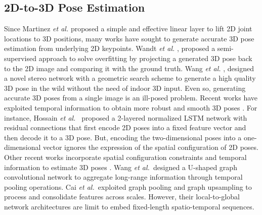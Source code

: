 \documentclass[letterpaper, 10 pt, conference, twoside]{ieeeconf}
\newcommand{\et}{{\em et al.\ }}
\begin{document}
\subsection{2D-to-3D Pose Estimation}
Since Martinez \emph{et al.} \cite{martinez2017simple} proposed a simple and effective linear layer to lift 2D joint locations to 3D positions, many works \cite{dabral2018learning,wandt2019repnet,wang2019generalizing} have sought to generate accurate 3D pose estimation from underlying 2D keypoints. Wandt \emph{et al.} \cite{wandt2019repnet}, proposed a semi-supervised approach to solve overfitting by projecting a generated 3D pose back to the 2D image and comparing it with the ground truth. Wang \emph{et al.} \cite{wang2019generalizing}, designed a novel stereo network with a geometric search scheme to generate a high quality 3D pose in the wild without the need of indoor 3D input. Even so, generating accurate 3D poses from a single image is an ill-posed problem. Recent works have exploited  temporal information to obtain more robust and smooth 3D poses \cite{dabral2018learning,rayat2018exploiting,pavllo20193d,cai2019exploiting,lee2018propagating}. For instance, Hossain \et \cite{rayat2018exploiting} proposed a 2-layered normalized LSTM network with residual connections that first encode 2D poses into a fixed feature vector and then decode it to a 3D pose. But, encoding the two-dimensional poses into a one-dimensional vector ignores the expression of the spatial configuration of 2D poses. Other recent works incorporate spatial configuration constraints and temporal information to estimate 3D poses \cite{cai2019exploiting, wang2020motion}. Wang \cite{wang2020motion} \et designed a U-shaped graph convolutional network to aggregate long-range information through temporal pooling operations. Cai \cite{cai2019exploiting} \et exploited graph pooling and graph upsampling to process and consolidate features across scales. However, their local-to-global network architectures are limit to embed fixed-length spatio-temporal sequences.
\end{document}
